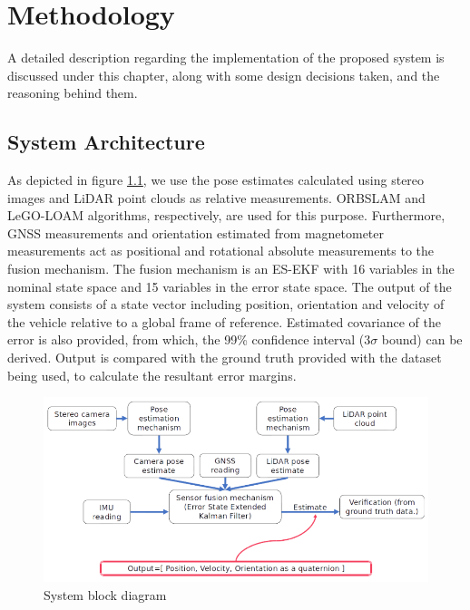 \chapter{Methodology}
A detailed description regarding the implementation of the proposed system is discussed under this chapter, along with some design decisions taken, and the reasoning behind them.




\section{System Architecture}
\label{sec:SystemArchitecture}
As depicted in figure \ref{fig:pa:systemBlockDiagram}, we use the pose estimates calculated using stereo images and \gls{LiDAR} point clouds as relative measurements. \gls{ORBSLAM} and \gls{LeGO-LOAM} algorithms, respectively, are used for this purpose. Furthermore, \gls{GNSS} measurements and orientation estimated from magnetometer measurements act as positional and rotational absolute measurements to the fusion mechanism. The fusion mechanism is an \gls{ES-EKF} with 16 variables in the nominal state space and 15 variables in the error state space. The output of the system consists of a state vector including position, orientation and velocity of the vehicle relative to a global frame of reference. Estimated covariance of the error is also provided, from which, the 99\% confidence interval ($3\sigma$ bound) can be derived. Output is compared with the ground truth provided with the dataset being used, to calculate the resultant error margins.
\begin{figure}[htp]
	\begin{center}
	\includegraphics[width=\textwidth]{figs/system-block-diagram.png}
	\end{center}
	\vspace{-0.5cm}
	\caption{System block diagram}
	\label{fig:pa:systemBlockDiagram}
	\vspace{0.5cm}
\end{figure}

